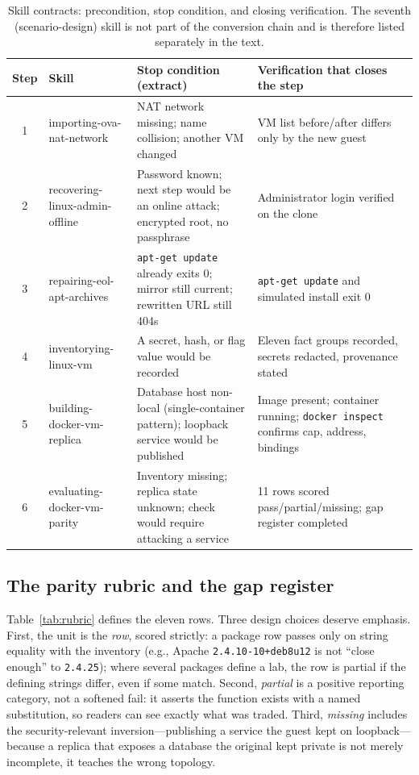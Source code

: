 \documentclass[3p,twocolumn,authoryear]{elsarticle}
\begin{document}
\begin{table}[tbp]
\caption{Skill contracts: precondition, stop condition, and closing
verification. The seventh (scenario-design) skill is not part of the
conversion chain and is therefore listed separately in the text.}
\label{tab:skills}
\centering\footnotesize
\begin{tabularx}{\textwidth}{clXX}
\toprule
Step & Skill & Stop condition (extract) & Verification that closes the step\\
\midrule
1 & importing-ova-nat-network & NAT network missing; name collision; another VM changed & VM list before/after differs only by the new guest\\
2 & recovering-linux-admin-offline & Password known; next step would be an online attack; encrypted root, no passphrase & Administrator login verified on the clone\\
3 & repairing-eol-apt-archives & \texttt{apt-get update} already exits 0; mirror still current; rewritten URL still 404s & \texttt{apt-get update} and simulated install exit 0\\
4 & inventorying-linux-vm & A secret, hash, or flag value would be recorded & Eleven fact groups recorded, secrets redacted, provenance stated\\
5 & building-docker-vm-replica & Database host non-local (single-container pattern); loopback service would be published & Image present; container running; \texttt{docker inspect} confirms cap, address, bindings\\
6 & evaluating-docker-vm-parity & Inventory missing; replica state unknown; check would require attacking a service & 11 rows scored pass/partial/missing; gap register completed\\
\bottomrule
\end{tabularx}
\end{table}

\subsection{The parity rubric and the gap register}
\label{sec:rubric}

Table~\ref{tab:rubric} defines the eleven rows. Three design choices
deserve emphasis. First, the unit is the \emph{row}, scored strictly:
a package row passes only on string equality with the inventory
(e.g., Apache \texttt{2.4.10-10+deb8u12} is not ``close enough'' to
\texttt{2.4.25}); where several packages define a lab, the row is
partial if the defining strings differ, even if some match. Second,
\emph{partial} is a positive reporting category, not a softened fail:
it asserts the function exists with a named substitution, so readers
can see exactly what was traded. Third, \emph{missing} includes the
security-relevant inversion---publishing a service the guest kept on
loopback---because a replica that exposes a database the original kept
private is not merely incomplete, it teaches the wrong topology.
\end{document}
